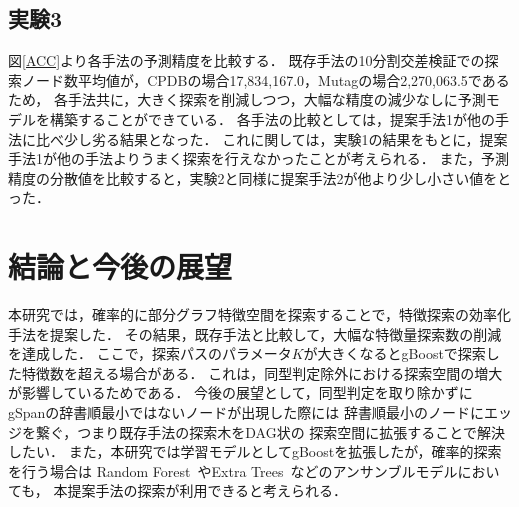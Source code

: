 \section{実験3}
図\ref{ACC}より各手法の予測精度を比較する．
既存手法の10分割交差検証での探索ノード数平均値が，CPDBの場合17,834,167.0，Mutagの場合2,270,063.5であるため，
各手法共に，大きく探索を削減しつつ，大幅な精度の減少なしに予測モデルを構築することができている．
各手法の比較としては，提案手法1が他の手法に比べ少し劣る結果となった．
これに関しては，実験1の結果をもとに，提案手法1が他の手法よりうまく探索を行えなかったことが考えられる．
また，予測精度の分散値を比較すると，実験2と同様に提案手法2が他より少し小さい値をとった．

\chapter{結論と今後の展望}
本研究では，確率的に部分グラフ特徴空間を探索することで，特徴探索の効率化手法を提案した．
その結果，既存手法と比較して，大幅な特徴量探索数の削減を達成した．
ここで，探索パスのパラメータ$K$が大きくなるとgBoostで探索した特徴数を超える場合がある．
これは，同型判定除外における探索空間の増大が影響しているためである．
今後の展望として，同型判定を取り除かずに
gSpanの辞書順最小ではないノードが出現した際には
辞書順最小のノードにエッジを繋ぐ，つまり既存手法の探索木をDAG状の
探索空間に拡張することで解決したい．
また，本研究では学習モデルとしてgBoostを拡張したが，確率的探索を行う場合は
Random Forest~\cite{RF}やExtra Trees~\cite{ET}などのアンサンブルモデルにおいても，
本提案手法の探索が利用できると考えられる．

